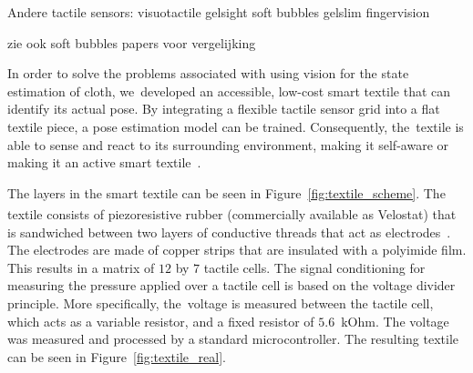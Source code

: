 \documentclass[\home/main.tex]{subfiles}
\begin{document}
Andere tactile sensors:
    visuotactile
        gelsight
        soft bubbles
        gelslim
        fingervision

    zie ook soft bubbles papers voor vergelijking 





In order to solve the problems associated with using vision for the state estimation of cloth, we~developed an accessible, low-cost smart textile that can identify its actual pose. By integrating a flexible tactile sensor grid into a flat textile piece, a pose estimation model can be trained. Consequently, the~textile is able to sense and react to its surrounding environment, making it self-aware or making it an active smart textile~\cite{Stoppa2014}.

The layers in the smart textile can be seen in Figure~\ref{fig:textile_scheme}. The textile consists of piezoresistive rubber (commercially available as Velostat\textsuperscript{\textregistered}) that is sandwiched between two layers of conductive threads that act as electrodes~\cite{Drimus2014}. The electrodes are made of copper strips that are insulated with a polyimide film. This results in a matrix of $12$ by $7$ tactile cells. The signal conditioning for measuring the pressure applied over a tactile cell is based on the voltage divider principle. More specifically, the~voltage is measured between the tactile cell, which acts as a variable resistor, and a fixed resistor of $5.6$~kOhm. The voltage was measured and processed by a standard microcontroller. The resulting textile can be seen in Figure~\ref{fig:textile_real}.
\end{document}
